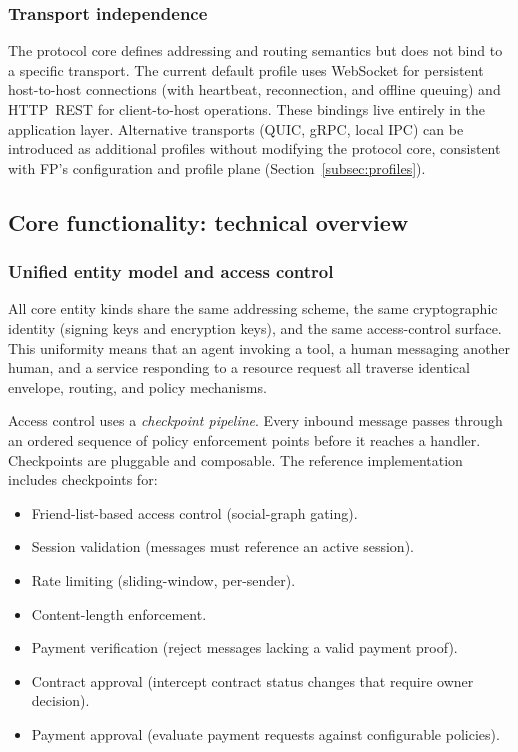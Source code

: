\documentclass{llmxive}
\begin{document}
\subsubsection{Transport independence}

The protocol core defines addressing and routing semantics but does not
bind to a specific transport.  The current default profile uses WebSocket
for persistent host-to-host connections (with heartbeat, reconnection,
and offline queuing) and HTTP~REST for client-to-host operations.  These
bindings live entirely in the application layer.  Alternative transports
(QUIC, gRPC, local IPC) can be introduced as additional profiles without
modifying the protocol core, consistent with FP's configuration and
profile plane (Section~\ref{subsec:profiles}).

\subsection{Core functionality: technical overview}
\label{app:functionality}

\subsubsection{Unified entity model and access control}

All core entity kinds share the same addressing scheme, the same
cryptographic identity (signing keys and encryption keys),
and the same access-control surface.  This uniformity means that an
agent invoking a tool, a human messaging another human, and a service
responding to a resource request all traverse identical envelope,
routing, and policy mechanisms.

Access control uses a \emph{checkpoint pipeline}. Every inbound message passes through an ordered sequence of policy enforcement points before it reaches a handler. Checkpoints are pluggable and composable. The reference implementation includes checkpoints for:

\begin{itemize}
    \item Friend-list-based access control (social-graph gating).
    \item Session validation (messages must reference an active session).
    \item Rate limiting (sliding-window, per-sender).
    \item Content-length enforcement.
    \item Payment verification (reject messages lacking a valid payment proof).
    \item Contract approval (intercept contract status changes that require owner decision).
    \item Payment approval (evaluate payment requests against configurable policies).
\end{itemize}
\end{document}

